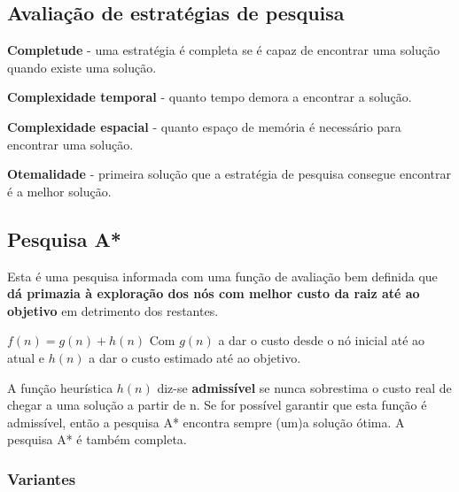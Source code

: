 \documentclass{article}
\begin{document}
\subsection{Avaliação de estratégias de pesquisa}

\begin{flushleft}
  \textbf{Completude} - uma estratégia é completa se é capaz de
  encontrar uma solução quando existe uma solução.

  \vspace{2mm}

  \textbf{Complexidade temporal} - quanto tempo demora a
  encontrar a solução.

  \vspace{2mm}

  \textbf{Complexidade espacial} - quanto espaço de memória é
  necessário para encontrar uma solução.

  \vspace{2mm}

  \textbf{Otemalidade} -  primeira solução que a estratégia de
  pesquisa consegue encontrar é a melhor solução.
\end{flushleft}

\subsection{Pesquisa A*}

Esta é uma pesquisa informada com uma função de avaliação bem definida que \textbf{dá primazia à
exploração dos nós com melhor custo da raiz até ao objetivo} em detrimento dos restantes.

\vspace{2mm}

$f(n) = g(n) + h(n)$ Com $g(n)$ a dar o custo desde o nó inicial até ao atual
e $h(n)$ a dar o custo estimado até ao objetivo.

\vspace{2mm}

A função heurística $h(n)$ diz-se \textbf{admissível} se nunca
sobrestima o custo real de chegar a uma solução a
partir de n. Se for possível garantir que esta função é admissível, então
a pesquisa A* encontra sempre (um)a solução ótima.
A pesquisa A* é também completa.

\pagebreak

\subsubsection{Variantes}
\end{document}
